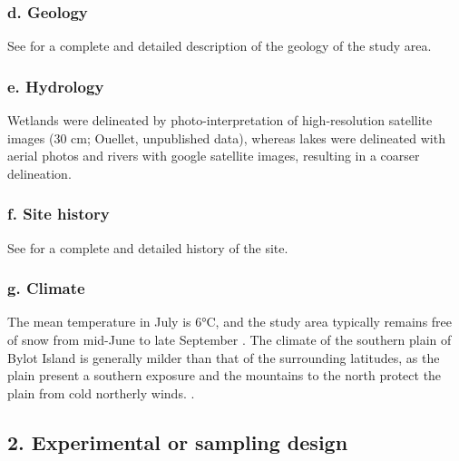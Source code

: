 \documentclass[a4paper,twoside,12pt]{article}
\begin{document}
                \subsubsection*{d. Geology} See \citet{klassen1993} for a complete and detailed description of the geology of the study area.
                \subsubsection*{e. Hydrology} Wetlands were delineated by photo-interpretation of high-resolution satellite images (30 cm; Ouellet, unpublished data), whereas lakes were delineated with aerial photos and rivers with google satellite images, resulting in a coarser delineation.
                \subsubsection*{f. Site history} See \citet{gauthier2024a, gauthier2024b}  for a complete and detailed history of the site.
                \subsubsection*{g. Climate} The mean temperature in July is 6°C, and the study area typically remains free of snow from mid-June to late September \citep{gauthier2013}. The climate of the southern plain of Bylot Island is generally milder than that of the surrounding latitudes, as the plain present a southern exposure and the mountains to the north protect the plain from cold northerly winds. \citep{gauthier2024a}.
 \newpage
       
        \subsection*{2. Experimental or sampling design}
\end{document}
